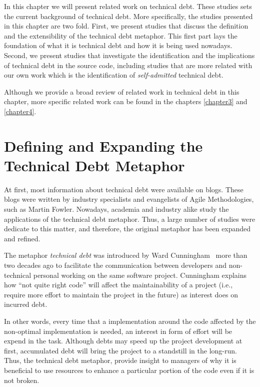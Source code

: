 
In this chapter we will present related work on technical debt. These studies sets the current background of technical debt. More specifically, the studies presented in this chapter are two fold. First, we present studies that discuss the definition and the extensibility of the technical debt metaphor. This first part lays the foundation of what it is technical debt and how it is being used nowadays. Second, we present studies that investigate the identification and the implications of technical debt in the source code, including studies that are more related with our own work which is the identification of \emph{self-admitted} technical debt. 

Although we provide a broad review of related work in technical debt in this chapter, more specific related work can be found in the chapters \ref{chapter3} and \ref{chapter4}.

\section{Defining and Expanding the Technical Debt Metaphor}
\label{defining_and_extending_technical_debt}

At first, most information about technical debt were available on blogs. These blogs were written by industry specialists and evangelists of Agile Methodologies, such as Martin Fowler. Nowadays, academia and industry alike study the applications of the technical debt metaphor. Thus, a large number of studies were dedicate to this matter, and therefore, the original metaphor has been expanded and refined.

The metaphor \textit{technical debt} was introduced by Ward Cunningham~\cite{Cunningham1992WPM} more than two decades ago to facilitate the communication between developers and non-technical personal working on the same software project. Cunningham explains how ``not quite right code'' will affect the maintainability of a project (i.e., require more effort to maintain the project in the future) as interest does on incurred debt. 

In other words, every time that a implementation around the code affected by the non-optimal implementation is needed, an interest in form of effort will be expend in the task. Although debts may speed up the project development at first, accumulated debt will bring the project to a standstill in the long-run. Thus, the technical debt metaphor, provide insight to managers of why it is beneficial to use resources to enhance a particular portion of the code even if it is not broken.

